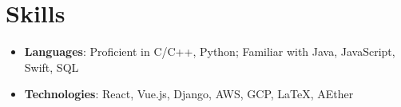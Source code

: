 \documentclass[letterpaper,11pt]{article}
\newcommand{\resumeItem}[2]{
  \item\small{
    \textbf{#1}{: #2 \vspace{-2pt}}
  }
}
\newcommand{\resumeSubItem}[2]{\resumeItem{#1}{#2}\vspace{-4pt}}
\newcommand{\resumeSubHeadingListStart}{\begin{itemize}[leftmargin=*]}
\newcommand{\resumeSubHeadingListEnd}{\end{itemize}}
\begin{document}
\section{Skills}
  \resumeSubHeadingListStart
    \resumeSubItem{Languages}
      {Proficient in C/C++, Python; Familiar with Java, JavaScript, Swift, SQL}
    \resumeSubItem{Technologies}
      {React, Vue.js, Django, AWS, GCP, \LaTeX, AEther}
  \resumeSubHeadingListEnd


\end{document}
